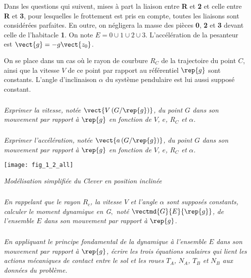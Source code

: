 \begin{multicols}{2}
Dans les questions qui suivent, mises à part la liaison entre \textbf{R} et \textbf{2} et celle entre \textbf{R} et \textbf{3}, pour lesquelles le frottement est pris en compte, toutes les liaisons sont considérées parfaites. En outre, on négligera la masse des pièces \textbf{0}, \textbf{2} et \textbf{3} devant celle de l'habitacle \textbf{1}. On note $E=0\cup 1 \cup 2 \cup 3$. L'accélération de la pesanteur est  $\vect{g}=-g\vect{z_0}$.

On se place dans un cas où le rayon de courbure $R_C$ de la trajectoire du point $C$, ainsi que la vitesse $V$ de ce point par rapport au référentiel $\rep{g}$ sont constants. L'angle d'inclinaison $\alpha$  du système pendulaire est lui aussi supposé constant.



\subparagraph{}\textit{Exprimer la vitesse, notée $\vect{V\left(G/\rep{g}\right)}$, du point $G$ dans son mouvement par rapport à $\rep{g}$ en fonction de $V$, $e$, $R_C$ et $\alpha$.}
\ifprof
\begin{corrige}
\end{corrige}
\else
\fi


\subparagraph{}\textit{Exprimer l'accélération, notée $\vect{a\left(G/\rep{g}\right)}$, du point $G$ dans son mouvement par rapport à $\rep{g}$ en fonction de $V$, $e$, $R_C$ et $\alpha$.}
\ifprof
\begin{corrige}
\end{corrige}
\else
\fi


\begin{center}%
\centering
\texttt{[image: fig\_1\_2\_all]}

\textit{Modélisation simplifiée du Clever en position inclinée}
\label{fig_1_2}
\end{center}
 
 
\subparagraph{}\textit{En rappelant que le rayon $R_c$, la vitesse $V$ et l'angle $\alpha$ sont supposés constants, calculer le moment dynamique en G$,$ noté $\vectmd{G}{E}{\rep{g}}$, de l'ensemble $E$ dans son mouvement par rapport à $\rep{g}$. }
\ifprof
\begin{corrige}
\end{corrige}
\else
\fi

\subparagraph{}\textit{En appliquant le principe fondamental de la dynamique à l'ensemble $E$ dans son mouvement par rapport à $\rep{g}$, écrire les trois équations scalaires qui lient les actions mécaniques de contact entre le sol et les roues $T_A$, $N_A$, $T_B$ et $N_B$ aux données du problème.}
\ifprof
\begin{corrige}
\end{corrige}
\else
\fi


\end{multicols}
